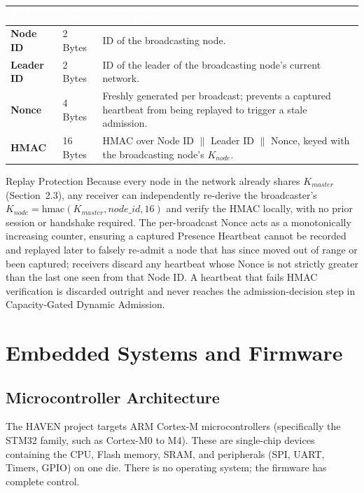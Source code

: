 \documentclass[11pt,a4paper]{article}
\newcommand{\citeref}[1]{}
\begin{document}
\begin{longtable}{@{}>{\bfseries}p{3.4cm}p{2cm}p{8.5cm}@{}}
\toprule
\rowcolor{havennavy}
\textcolor{white}{Field} & \textcolor{white}{Size} & \textcolor{white}{Description} \\
\midrule
\endhead
Node ID & 2 Bytes & ID of the broadcasting node. \\
Leader ID & 2 Bytes & ID of the leader of the broadcasting node's current network. \\
Nonce & 4 Bytes & Freshly generated per broadcast; prevents a captured heartbeat from being replayed to trigger a stale admission. \\
HMAC & 16 Bytes & HMAC over Node ID $\|$ Leader ID $\|$ Nonce, keyed with the broadcasting node's $K_{node}$. \\
\bottomrule
\end{longtable}

\begin{notebox}{Replay Protection}
Because every node in the network already shares $K_{master}$ (Section~2.3), any receiver can independently re-derive the broadcaster's $K_{node} = \text{hmac}(K_{master}, node\_id, 16)$ and verify the HMAC locally, with no prior session or handshake required. The per-broadcast Nonce acts as a monotonically increasing counter, ensuring a captured Presence Heartbeat cannot be recorded and replayed later to falsely re-admit a node that has since moved out of range or been captured; receivers discard any heartbeat whose Nonce is not strictly greater than the last one seen from that Node ID. A heartbeat that fails HMAC verification is discarded outright and never reaches the admission-decision step in Capacity-Gated Dynamic Admission.
\end{notebox}

\section{Embedded Systems and Firmware}

\subsection{Microcontroller Architecture}

The HAVEN project targets ARM Cortex-M microcontrollers (specifically the STM32 family, such as Cortex-M0 to M4).\citeref{4} These are single-chip devices containing the CPU, Flash memory, SRAM, and peripherals (SPI, UART, Timers, GPIO) on one die.\citeref{4} There is no operating system; the firmware has complete control.\citeref{4}
\end{document}

